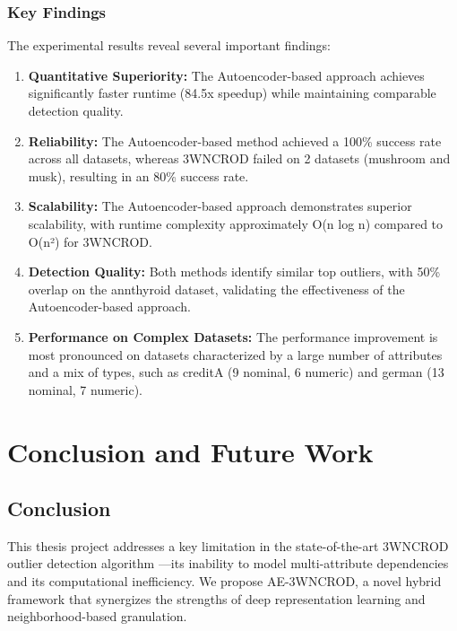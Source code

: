 \documentclass[12pt,a4paper]{article}
\begin{document}
\subsubsection{Key Findings}

The experimental results reveal several important findings:

\begin{enumerate}
\item \textbf{Quantitative Superiority:} The Autoencoder-based approach achieves significantly faster runtime (84.5x speedup) while maintaining comparable detection quality.

\item \textbf{Reliability:} The Autoencoder-based method achieved a 100\% success rate across all datasets, whereas 3WNCROD failed on 2 datasets (mushroom and musk), resulting in an 80\% success rate.

\item \textbf{Scalability:} The Autoencoder-based approach demonstrates superior scalability, with runtime complexity approximately O(n log n) compared to O(n²) for 3WNCROD.

\item \textbf{Detection Quality:} Both methods identify similar top outliers, with 50\% overlap on the annthyroid dataset, validating the effectiveness of the Autoencoder-based approach.

\item \textbf{Performance on Complex Datasets:} The performance improvement is most pronounced on datasets characterized by a large number of attributes and a mix of types, such as creditA (9 nominal, 6 numeric) and german (13 nominal, 7 numeric).
\end{enumerate}

\section{Conclusion and Future Work}

\subsection{Conclusion}

This thesis project addresses a key limitation in the state-of-the-art 3WNCROD outlier detection algorithm \cite{zhang2024}—its inability to model multi-attribute dependencies and its computational inefficiency. We propose AE-3WNCROD, a novel hybrid framework that synergizes the strengths of deep representation learning and neighborhood-based granulation.
\end{document}
